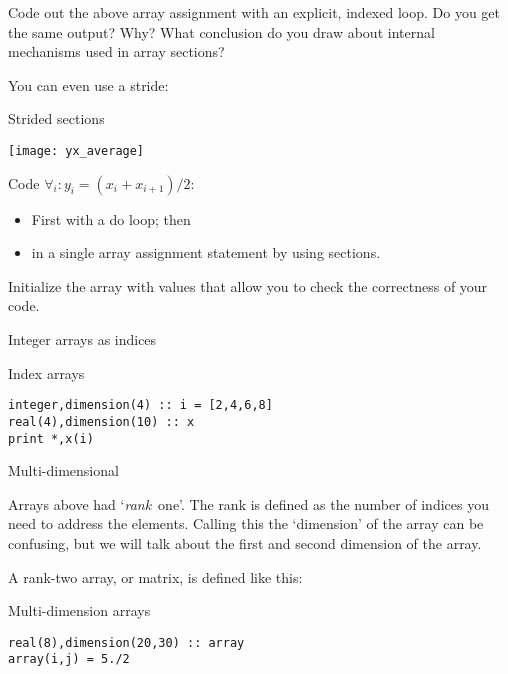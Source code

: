 \begin{exercise}
  \label{ex:sect-vs-loop}
  Code out the above array assignment with an explicit,
  indexed loop. Do you get the same output? Why? What conclusion do
  you draw about internal mechanisms used in array sections?
\end{exercise}

You can even use a stride:

\begin{block}{Strided sections}
  \label{sl:farray-strideassign}
\end{block}

\begin{exercise}
  \label{ex:farray-shift}

  \texttt{[image: yx\_average]}

  Code $\forall_i\colon y_i=(x_i+x_{i+1})/2$:
  \begin{itemize}
  \item First with a do loop; then
  \item in a single array assignment statement by using sections.
  \end{itemize}
  Initialize the array  with values that allow you to check the
  correctness of your code.
\end{exercise}

 {Integer arrays as indices}

\begin{block}{Index arrays}
  \label{sl:farray-indexarray}
\begin{lstlisting}
integer,dimension(4) :: i = [2,4,6,8]
real(4),dimension(10) :: x
print *,x(i)
\end{lstlisting}
\end{block}

 {Multi-dimensional}

Arrays above had `\emph{rank}~one'. The rank is
defined as the number of indices you need to address the
elements. Calling this the `dimension' of the array can be confusing, but
we will talk about the first and second dimension of the array.

A rank-two array, or matrix, is defined like this:
\begin{block}{Multi-dimension arrays}
  \label{sl:farray-2d}
\begin{lstlisting}
real(8),dimension(20,30) :: array
array(i,j) = 5./2
\end{lstlisting}
\end{block}

